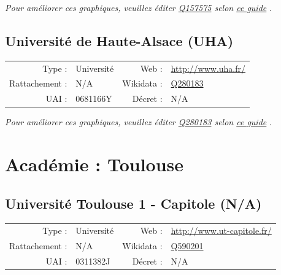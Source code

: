 \documentclass[11pt,french,landscape]{article}
\begin{document}
\textit{\scriptsize Pour améliorer ces graphiques, veuillez éditer \href{https://www.wikidata.org/entity/Q157575}{Q157575}  selon \href{https://github.com/cpesr/wikidataESR/blob/master/Rmd/wikidataESR.md}{ce guide}}
.


\newpage

\hypertarget{universituxe9-de-haute-alsace-uha}{%
\subsection{Université de Haute-Alsace
(UHA)}\label{universituxe9-de-haute-alsace-uha}}

\begin{tabular*}{0.45\textwidth}{rp{2cm}rl}  
\hline  
Type : & Université & Web : &\href{http://www.uha.fr/}{http://www.uha.fr/} \\  
Rattachement : & N/A & Wikidata : & \href{https://www.wikidata.org/entity/Q280183}{Q280183} \\  
UAI : & 0681166Y & Décret : & N/A \\  
\hline  
\end{tabular*}

\textit{\scriptsize Pour améliorer ces graphiques, veuillez éditer \href{https://www.wikidata.org/entity/Q280183}{Q280183}  selon \href{https://github.com/cpesr/wikidataESR/blob/master/Rmd/wikidataESR.md}{ce guide}}
.


\newpage

\hypertarget{acaduxe9mie-toulouse}{%
\section{Académie : Toulouse}\label{acaduxe9mie-toulouse}}

\hypertarget{universituxe9-toulouse-1---capitole-na}{%
\subsection{Université Toulouse 1 - Capitole
(N/A)}\label{universituxe9-toulouse-1---capitole-na}}

\begin{tabular*}{0.45\textwidth}{rp{2cm}rl}  
\hline  
Type : & Université & Web : &\href{http://www.ut-capitole.fr/}{http://www.ut-capitole.fr/} \\  
Rattachement : & N/A & Wikidata : & \href{https://www.wikidata.org/entity/Q590201}{Q590201} \\  
UAI : & 0311382J & Décret : & N/A \\  
\hline  
\end{tabular*}
\end{document}
